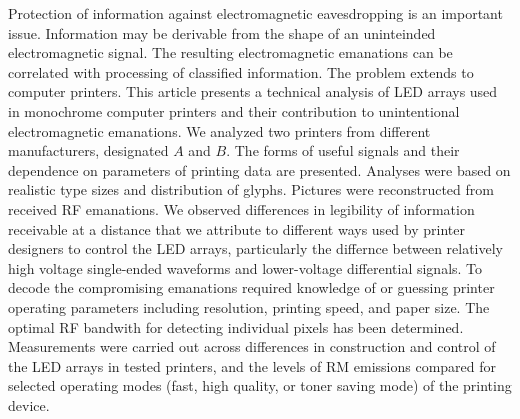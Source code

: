 Protection of information against electromagnetic eavesdropping is an
important issue. Information may be derivable from the shape of an uninteinded
electromagnetic signal. The resulting electromagnetic emanations can be
correlated with processing of classified information. The problem extends to
computer printers. This article presents a technical analysis of LED arrays
used in monochrome computer printers and their contribution to unintentional
electromagnetic emanations. We analyzed two printers from different
manufacturers, designated $A$ and $B$. The forms of useful signals and their
dependence on parameters of printing data are presented. Analyses were based
on realistic type sizes and distribution of glyphs. Pictures were
reconstructed from received RF emanations. We observed differences in
legibility of information receivable at a distance that we attribute to
different ways used by printer designers to control the LED arrays,
particularly the differnce between relatively high voltage single-ended
waveforms and lower-voltage differential signals. To decode the compromising
emanations required knowledge of or guessing printer operating parameters
including resolution, printing speed, and paper size. The optimal RF bandwith
for detecting individual pixels has been determined. Measurements were
carried out across differences in construction and control of the LED arrays
in tested printers, and the levels of RM emissions compared for selected
operating modes (fast, high quality, or toner saving mode) of the printing
device.
